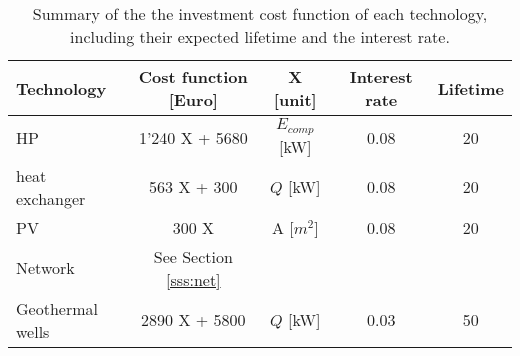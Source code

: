 \begin{table}[htp]
	\centering
	\caption{Summary of the the investment cost function of each technology, including their expected lifetime and the interest rate.}
	\label{tab:ic}
\begin{tabular}{lcccc} \toprule
	\textbf{Technology} & Cost function [Euro] & X  [unit]       & Interest rate & Lifetime \\ \midrule
	HP                  & 1'240 X + 5680       & $E_{comp}$ [kW] & 0.08                              & 20                           \\
	heat exchanger      & 563 X + 300          & $Q$ [kW]        & 0.08                              & 20                           \\
	PV                  & 300 X                & A [$m^{2}$]     & 0.08                              & 20                           \\
 	Network				& See Section \ref{sss:net}					&					 &									 &								 \\
	Geothermal wells    & 2890 X + 5800        & $Q$ [kW]        & 0.03                              & 50                     \\ \bottomrule     
\end{tabular}
\end{table}